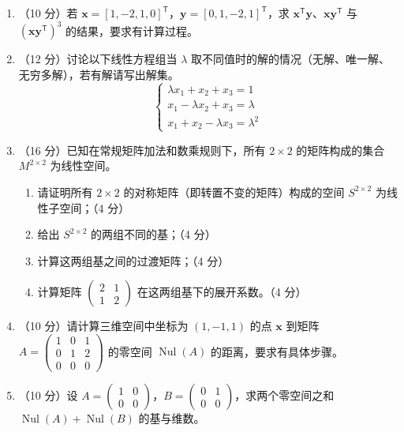 \documentclass[11pt]{ctexart}
\newcommand{\Nul}{\operatorname{Nul}}
\newcommand{\TT}{^{\mathsf T}}
\newcommand{\bv}[1]{\begin{pmatrix}#1\end{pmatrix}}
\begin{document}
\begin{enumerate}

\item （10 分）若 $\mathbf x=[1,-2,1,0]\TT$，$\mathbf y=[0,1,-2,1]\TT$，求 $\mathbf x\TT\mathbf y$、$\mathbf x\mathbf y\TT$ 与 $(\mathbf x\mathbf y\TT)^3$ 的结果，要求有计算过程。

\vspace{7cm}

\item （12 分）讨论以下线性方程组当 $\lambda$ 取不同值时的解的情况（无解、唯一解、无穷多解），若有解请写出解集。
\[
\begin{cases}
\lambda x_1+x_2+x_3=1\\
x_1-\lambda x_2+x_3=\lambda\\
x_1+x_2-\lambda x_3=\lambda^2
\end{cases}
\]

\newpage

\item （16 分）已知在常规矩阵加法和数乘规则下，所有 $2\times2$ 的矩阵构成的集合 $M^{2\times2}$ 为线性空间。

\begin{enumerate}[label=(\arabic*),leftmargin=2.2em,itemsep=8pt]
\item 请证明所有 $2\times2$ 的对称矩阵（即转置不变的矩阵）构成的空间 $S^{2\times2}$ 为线性子空间；（4 分）
\item 给出 $S^{2\times2}$ 的两组不同的基；（4 分）
\item 计算这两组基之间的过渡矩阵；（4 分）
\item 计算矩阵 $\bv{2&1\\1&2}$ 在这两组基下的展开系数。（4 分）
\end{enumerate}

\vspace{8cm}

\item （10 分）请计算三维空间中坐标为 $(1,-1,1)$ 的点 $\mathbf x$ 到矩阵
$A=\bv{1&0&1\\0&1&2\\0&0&0}$ 的零空间 $\Nul(A)$ 的距离，要求有具体步骤。

\newpage

\item （10 分）设 $A=\bv{1&0\\0&0}$，$B=\bv{0&1\\0&0}$，求两个零空间之和 $\Nul(A)+\Nul(B)$ 的基与维数。


\end{enumerate}
\end{document}
